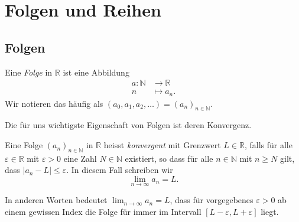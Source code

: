 \documentclass[../main.tex]{subfiles}
\begin{document}
\chapter{Folgen und Reihen}
\section{Folgen}
\begin{definition}
	Eine \emph{Folge} in $\mathbb{R}$ ist eine Abbildung
  \begin{align*}
    a \colon \mathbb{N} & \to \mathbb{R} \\
    n & \mapsto a_n.
  \end{align*}
  Wir notieren das häufig als 
  $(a_0, a_1, a_2, \dots) = {(a_n)}_{n \in \mathbb{N}}$.
\end{definition}

Die für uns wichtigste Eigenschaft von Folgen ist deren Konvergenz.

\begin{definition}
	Eine Folge ${(a_n)}_{n \in \mathbb{N}}$ in $\mathbb{R}$
	heisst \emph{konvergent} mit Grenzwert
	$L \in \mathbb{R}$, falls für alle
	$\varepsilon \in \mathbb{R}$ mit $\varepsilon > 0$
	eine Zahl $N \in \mathbb{N}$ existiert,
	so dass für alle $n\in \mathbb{N}$ 
	mit $n \geq N$ gilt, dass
	$|a_n - L| \leq \varepsilon$. In diesem Fall schreiben wir
	\[
	  \lim_{n \to \infty} a_n = L.
	\]
\end{definition}

In anderen Worten bedeutet $\lim_{n \to \infty} a_n = L$, dass
für vorgegebenes $\varepsilon > 0$
ab einem gewissen Index die Folge für immer im Intervall
$[L- \varepsilon, L + \varepsilon]$ liegt.
\end{document}
